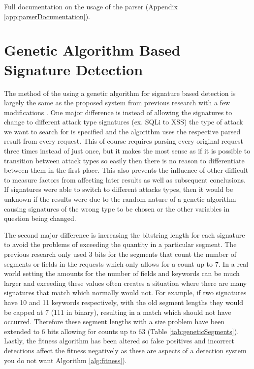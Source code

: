 Full documentation on the usage of the parser (Appendix \ref{app:parserDocumentation}).

\section{Genetic Algorithm Based Signature Detection}\label{sec:genIntro}

The method of the using a genetic algorithm for signature based detection is largely the same as the proposed system from previous research with a few modifications \cite{mainPaper}.  One major difference is instead of allowing the signatures to change to different attack type signatures (ex. SQLi to XSS) the type of attack we want to search for is specified and the algorithm uses the respective parsed result from every request.  This of course requires parsing every original request three times instead of just once, but it makes the most sense as if it is possible to transition between attack types so easily then there is no reason to differentiate between them in the first place.  This also prevents the influence of other difficult to measure factors from affecting later results as well as subsequent conclusions.  If signatures were able to switch to different attacks types, then it would be unknown if the results were due to the random nature of a genetic algorithm causing signatures of the wrong type to be chosen or the other variables in question being changed.

The second major difference is increasing the bitstring length for each signature to avoid the problems of exceeding the quantity in a particular segment.  The previous research only used 3 bits for the segments that count the number of segments or fields in the requests which only allows for a count up to 7.  In a real world setting the amounts for the number of fields and keywords can be much larger and exceeding these values often creates a situation where there are many signatures that match which normally would not.  For example, if two signatures have 10 and 11 keywords respectively, with the old segment lengths they would be capped at 7 (111 in binary), resulting in a match which should not have occurred.  Therefore these segment lengths with a size problem have been extended to 6 bits allowing for counts up to 63 (Table \ref{tab:geneticSegments}).  Lastly, the fitness algorithm has been altered so false positives and incorrect detections affect the fitness negatively as these are aspects of a detection system you do not want Algorithm \ref{alg:fitness}).

